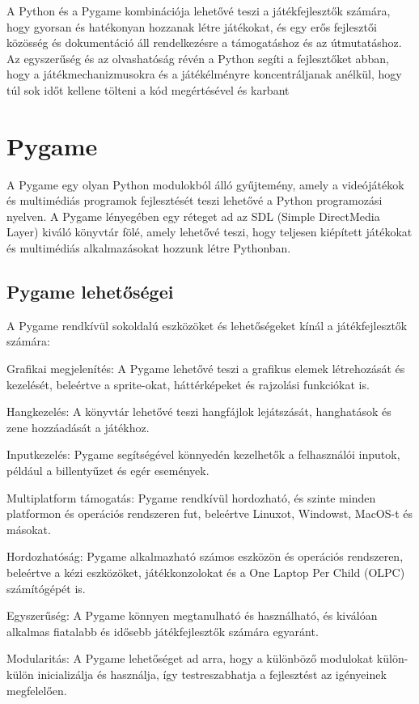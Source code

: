 A Python és a Pygame kombinációja lehetővé teszi a játékfejlesztők számára, hogy gyorsan és hatékonyan hozzanak létre játékokat, és egy erős fejlesztői közösség és dokumentáció áll rendelkezésre a támogatáshoz és az útmutatáshoz. Az egyszerűség és az olvashatóság révén a Python segíti a fejlesztőket abban, hogy a játékmechanizmusokra és a játékélményre koncentráljanak anélkül, hogy túl sok időt kellene tölteni a kód megértésével és karbant


\section{Pygame}
A Pygame egy olyan Python modulokból álló gyűjtemény, amely a videójátékok és multimédiás programok fejlesztését teszi lehetővé a Python programozási nyelven. A Pygame lényegében egy réteget ad az SDL (Simple DirectMedia Layer) kiváló könyvtár fölé, amely lehetővé teszi, hogy teljesen kiépített játékokat és multimédiás alkalmazásokat hozzunk létre Pythonban.
\subsection{Pygame lehetőségei}
A Pygame rendkívül sokoldalú eszközöket és lehetőségeket kínál a játékfejlesztők számára:

Grafikai megjelenítés: A Pygame lehetővé teszi a grafikus elemek létrehozását és kezelését, beleértve a sprite-okat, háttérképeket és rajzolási funkciókat is.

Hangkezelés: A könyvtár lehetővé teszi hangfájlok lejátszását, hanghatások és zene hozzáadását a játékhoz.

Inputkezelés: Pygame segítségével könnyedén kezelhetők a felhasználói inputok, például a billentyűzet és egér események.

Multiplatform támogatás: Pygame rendkívül hordozható, és szinte minden platformon és operációs rendszeren fut, beleértve Linuxot, Windowst, MacOS-t és másokat.

Hordozhatóság: Pygame alkalmazható számos eszközön és operációs rendszeren, beleértve a kézi eszközöket, játékkonzolokat és a One Laptop Per Child (OLPC) számítógépét is.

Egyszerűség: A Pygame könnyen megtanulható és használható, és kiválóan alkalmas fiatalabb és idősebb játékfejlesztők számára egyaránt.

Modularitás: A Pygame lehetőséget ad arra, hogy a különböző modulokat külön-külön inicializálja és használja, így testreszabhatja a fejlesztést az igényeinek megfelelően.

